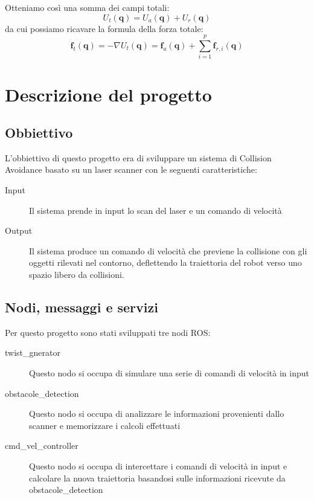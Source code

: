 \documentclass[Lau, binding=0.6cm, twoside]{sapthesis}
\begin{document}
Otteniamo così una somma dei campi totali:
$$
U_{t}(\boldsymbol{q})=U_{a}(\boldsymbol{q})+U_{r}(\boldsymbol{q})
$$
da cui possiamo ricavare la formula della forza totale:
$$
\boldsymbol{f}_{t}(\boldsymbol{q})=-\nabla U_{t}(\boldsymbol{q})=\boldsymbol{f}_{a}(\boldsymbol{q})+\sum_{i=1}^{p} \boldsymbol{f}_{r, i}(\boldsymbol{q})
$$

\chapter{Descrizione del progetto}
\section{Obbiettivo}
L'obbiettivo di questo progetto era di sviluppare un sistema di Collision Avoidance basato su un laser scanner con le seguenti caratteristiche:
\begin{description}
	\item[Input] Il sistema prende in input lo scan del laser e un comando di velocità
	\item[Output] Il sistema produce un comando di velocità che previene la collisione con gli oggetti rilevati nel contorno, deflettendo la traiettoria del robot verso uno spazio libero da collisioni.
\end{description}

\section{Nodi, messaggi e servizi}
Per questo progetto sono stati sviluppati tre nodi ROS:
\begin{description}
	\item[twist\_gnerator] Questo nodo si occupa di simulare una serie di comandi di velocità in input
	\item[obstacole\_detection] Questo nodo si occupa di analizzare le informazioni provenienti dallo scanner e memorizzare i calcoli effettuati
	\item[cmd\_vel\_controller] Questo nodo si occupa di intercettare i comandi di velocità in input e calcolare la nuova traiettoria basandosi sulle informazioni ricevute da obstacole\_detection
\end{description}



\end{document}
